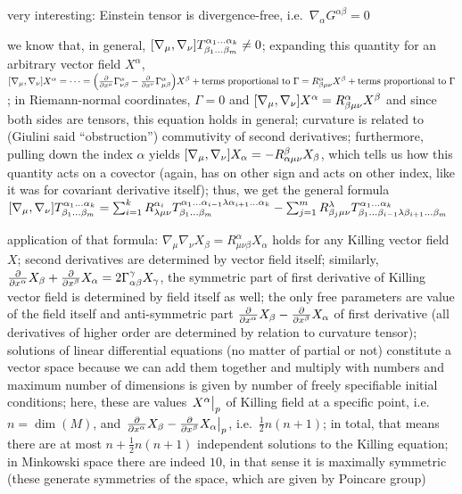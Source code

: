 very interesting: Einstein tensor is divergence-free, i.e.~$\nabla_\alpha G^{\alpha \beta} = 0$

we know that, in general, $\qty[\nabla_\mu, \nabla_\nu] T^{\alpha_1 \dots \alpha_k}_{\beta_1 \dots \beta_m} \neq 0$; expanding this quantity for an arbitrary vector field $X^\alpha$, $\qty[\nabla_\mu, \nabla_\nu] X^\alpha = \dots = \qty(\pdv{x^\mu} \Gamma_{\nu \beta}^\alpha - \pdv{x^\nu} \Gamma_{\mu \beta}^\alpha) X^\beta + \text{terms proportional to } \Gamma = R^\alpha_{\beta \mu \nu} X^\beta + \text{terms proportional to } \Gamma$; in Riemann-normal coordinates, $\Gamma = 0$ and $\qty[\nabla_\mu, \nabla_\nu] X^\alpha = R^\alpha_{\beta \mu \nu} X^\beta$ and since both sides are tensors, this equation holds in general; curvature is related to (Giulini said \enquote{obstruction}) commutivity of second derivatives; furthermore, pulling down the index $\alpha$ yields $\qty[\nabla_\mu, \nabla_\nu] X_\alpha = - R^\beta_{\alpha \mu \nu} X_\beta$, which tells us how this quantity acts on a covector (again, has on other sign and acts on other index, like it was for covariant derivative itself); thus, we get the general formula $\qty[\nabla_\mu, \nabla_\nu] T^{\alpha_1 \dots \alpha_k}_{\beta_1 \dots \beta_m} = \sum_{i = 1}^k R^{\alpha_i}_{\lambda \mu \nu} T^{\alpha_1 \dots \alpha_{i - 1} \lambda \alpha_{i + 1} \dots \alpha_k}_{\beta_1 \dots \beta_m} - \sum_{j = 1}^m R^\lambda_{\beta_j \mu \nu} T^{\alpha_1 \dots \alpha_k}_{\beta_1 \dots \beta_{i - 1} \lambda \beta_{i + 1} \dots \beta_m}$

application of that formula: $\nabla_\mu \nabla_\nu X_\beta = R^\alpha_{\mu \nu \beta} X_\alpha$ holds for any Killing vector field $X$; second derivatives are determined by vector field itself; similarly, $\pdv{x^\alpha} X_\beta + \pdv{x^\beta} X_\alpha = 2 \Gamma_{\alpha \beta}^\gamma X_\gamma$, the symmetric part of first derivative of Killing vector field is determined by field itself as well; the only free parameters are value of the field itself and anti-symmetric part $\pdv{x^\alpha} X_\beta - \pdv{x^\beta} X_\alpha$ of first derivative (all derivatives of higher order are determined by relation to curvature tensor); solutions of linear differential equations (no matter of partial or not) constitute a vector space because we can add them together and multiply with numbers and maximum number of dimensions is given by number of freely specifiable initial conditions; here, these are values $\eval{X^\alpha}_p$ of Killing field at a specific point, i.e.~$n = \dim(M)$, and $\eval{\pdv{x^\alpha} X_\beta - \pdv{x^\beta} X_\alpha}_p$, i.e.~$\frac{1}{2} n (n + 1)$; in total, that means there are at most $n + \frac{1}{2} n (n + 1)$ independent solutions to the Killing equation; in Minkowski space there are indeed $10$, in that sense it is maximally symmetric (these generate symmetries of the space, which are given by Poincare group)


